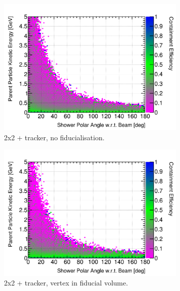 \documentclass[10pt,a4paper,openany]{article}
\begin{document}
\begin{figure}[htbp]
\begin{subfigure}[b]{0.49\textwidth}
		\includegraphics[width=1.0\textwidth]{EM_cont_eff_2x2_Scintillator_gap.png}
		\caption{2x2 + tracker, no fiducialisation.}
		\label{}
	\end{subfigure}	
	\hfill
	\begin{subfigure}[b]{0.49\textwidth}
		\centering
		\includegraphics[width=1.0\textwidth]{EM_cont_eff_2x2_Scintillator_fiducial_gap.png}
		\caption{2x2 + tracker, vertex in fiducial volume.}
		\label{}
	\end{subfigure}
	\begin{subfigure}[b]{0.49\textwidth}
		\centering

\end{subfigure}
\end{figure}
\end{document}
